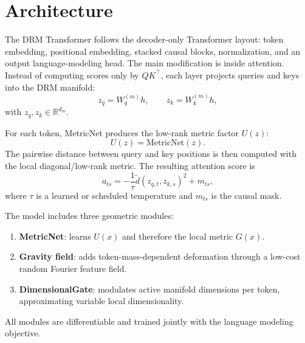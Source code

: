 \section{Architecture}
\label{sec:architecture}

The DRM Transformer follows the decoder-only Transformer layout: token
embedding, positional embedding, stacked causal blocks, normalization, and an
output language-modeling head. The main modification is inside attention.
Instead of computing scores only by $QK^\top$, each layer projects queries and
keys into the DRM manifold:
\begin{equation}
  z_q = W_q^{(m)} h,\qquad z_k = W_k^{(m)} h,
\end{equation}
with $z_q,z_k\in\mathbb{R}^{d_m}$.

For each token, MetricNet produces the low-rank metric factor $U(z)$:
\begin{equation}
  U(z)=\mathrm{MetricNet}(z).
\end{equation}
The pairwise distance between query and key positions is then computed with the
local diagonal/low-rank metric. The resulting attention score is
\begin{equation}
  a_{ts} = -\frac{1}{\tau}\tilde d(z_{q,t},z_{k,s})^2 + m_{ts},
\end{equation}
where $\tau$ is a learned or scheduled temperature and $m_{ts}$ is the causal
mask.

The model includes three geometric modules:
\begin{enumerate}
  \item \textbf{MetricNet}: learns $U(x)$ and therefore the local metric
  $G(x)$.
  \item \textbf{Gravity field}: adds token-mass-dependent deformation through a
  low-cost random Fourier feature field.
  \item \textbf{DimensionalGate}: modulates active manifold dimensions per
  token, approximating variable local dimensionality.
\end{enumerate}

All modules are differentiable and trained jointly with the language modeling
objective.
